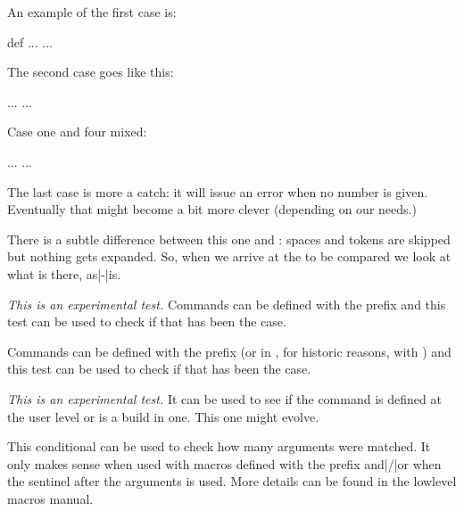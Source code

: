 An example of the first case is:

\starttyping[option=TEX]
 {def}%
  ...
\else
  ...
\fi
\stoptyping

The second case goes like this:

\starttyping[option=TEX]
\iftok\scratchtoksone\scratchtokstwo
  ...
\else
  ...
\fi
\stoptyping

Case one and four mixed:

\starttyping[option=TEX]
\TempX
  ...
\else
  ...
\fi
\stoptyping

The last case is more a catch: it will issue an error when no number is given.
Eventually that might become a bit more clever (depending on our needs.)

\stopsubsection

\startsubsection[title={\tex{ifcstok}}]

There is a subtle difference between this one and : spaces
and \type {\relax} tokens are skipped but nothing gets expanded. So, when
we arrive at the to be compared  we look at what is there,
as|-|is.

\stopsubsection

\startsubsection[title={\tex{iffrozen}}]

{\em This is an experimental test.} Commands can be defined with the \type
{\frozen} prefix and this test can be used to check if that has been the case.

\stopsubsection

\startsubsection[title={\tex{ifprotected}}]

Commands can be defined with the \type {\protected} prefix (or in \CONTEXT, for
historic reasons, with \type {\unexpanded}) and this test can be used to check if
that has been the case.

\stopsubsection

\startsubsection[title={\tex{ifusercmd}}]

{\em This is an experimental test.} It can be used to see if the command is
defined at the user level or is a build in one. This one might evolve.

\stopsubsection

\startsubsection[title={\tex{ifarguments}}]

This conditional can be used to check how many arguments were matched. It only
makes sense when used with macros defined with the \type {\tolerant} prefix
and|/|or when the sentinel \type {\ignorearguments} after the arguments is used.
More details can be found in the lowlevel macros manual.

